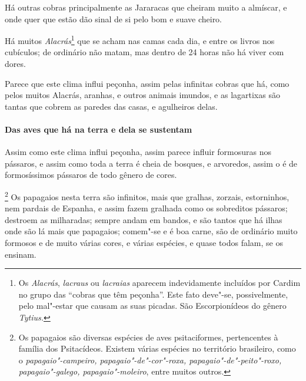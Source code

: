  Há outras cobras principalmente as Jararacas que cheiram muito a
almíscar, e onde quer que estão dão sinal de si pelo bom e suave cheiro.

 Há muitos \textit{Alacrás}\footnote{ Os \textit{Alacrás},
\textit{lacraus} ou \textit{lacraias} aparecem indevidamente incluídos por Cardim no grupo
das ``cobras que têm peçonha''. Este fato deve"-se, possivelmente, pelo
mal"-estar que causam as suas picadas. São Escorpionídeos do gênero
\textit{Tytius.}} que se acham nas camas cada dia, e entre os livros
nos cubículos; de ordinário não matam, mas dentro de 24 horas não há
viver com dores.

 Parece que este clima influi peçonha, assim pelas infinitas cobras que
há, como pelos muitos Alacrás, aranhas, e outros animais imundos, e as
lagartixas são tantas que cobrem as paredes das casas, e agulheiros
delas.

\paragraph{Das aves que há na terra e dela se sustentam}

Assim como este clima influi peçonha, assim parece influir
formosuras nos pássaros, e assim como toda a terra é cheia de bosques,
e arvoredos, assim o é de formosíssimos pássaros de todo gênero de
cores.

\footnote{ Os papagaios são diversas espécies de
aves psitaciformes, pertencentes à família dos Psitacídeos. Existem
várias espécies no território brasileiro, como o
\textit{papagaio"-campeiro, papagaio"-de"-cor"-roxa,
papagaio"-de"-peito"-roxo, papagaio"-galego, papagaio"-moleiro}, entre
muitos outros.} Os papagaios nesta terra são infinitos, mais
que gralhas, zorzais, estorninhos, nem pardais de Espanha, e assim
fazem gralhada como os sobreditos pássaros; destroem as milharadas;
sempre andam em bandos, e são tantos que há ilhas onde são lá mais que
papagaios; comem"-se e é boa carne, são de ordinário muito formosos e de
muito várias cores, e várias espécies, e quase todos falam, se os
ensinam.

